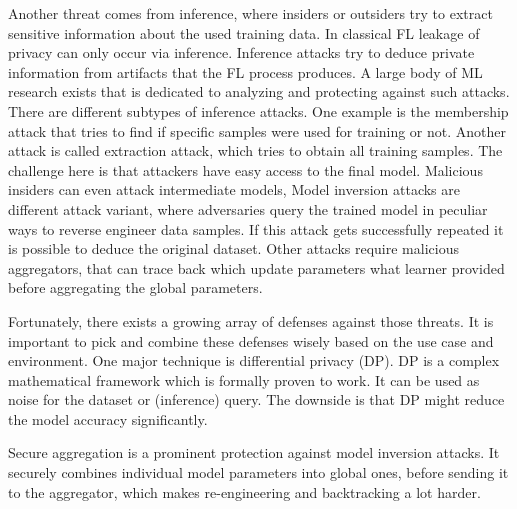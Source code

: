 Another threat comes from inference, where 
insiders or outsiders try to extract sensitive information
about the used training data.
In classical FL leakage of privacy can only occur via inference.
Inference attacks try to deduce private information from
artifacts that the FL process produces.
A large body of ML research exists that is dedicated
to analyzing and protecting against such attacks.
There are different subtypes of inference attacks.
One example is the membership attack that tries to find if
specific samples were used for training or not.
Another attack is called extraction attack, which tries to
obtain all training samples.
The challenge here is that attackers have easy access to the final model.
Malicious insiders can even attack intermediate models,
Model inversion attacks are different attack variant,
where adversaries query the trained model in peculiar ways to
reverse engineer data samples. 
If this attack gets successfully repeated it is possible to
deduce the original dataset.
Other attacks require malicious aggregators, that can
trace back which update parameters what learner provided
before aggregating the global parameters.

Fortunately, there exists a growing array of defenses against those threats.
It is important to pick and combine these defenses wisely based on the use case and environment.
One major technique is differential privacy (DP).
DP is a complex mathematical framework which is formally proven to work.
It can be used as noise for the dataset or (inference) query.
The downside is that DP might reduce the model accuracy significantly.

Secure aggregation is a prominent protection against model inversion attacks.
It securely combines individual model parameters into global ones, before
sending it to the aggregator, which makes re-engineering and backtracking a lot harder. \cite{paper:cluster-based-secure-aggregation-FL}